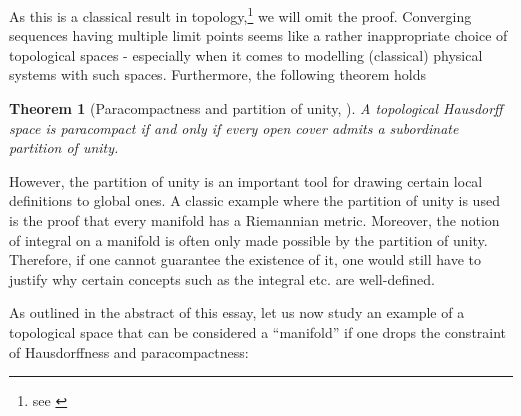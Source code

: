 \documentclass[a4paper, 12pt]{article}
\newtheorem{theorem}{Theorem}
\theoremstyle{iremark}
\begin{document}
As this is a classical result in topology,\footnote{see \cite{wiki}} we will omit the proof. 
Converging sequences having multiple limit points seems like a rather inappropriate choice of topological spaces 
- especially when it comes to modelling (classical) physical systems with such spaces.
Furthermore, the following theorem holds
\begin{theorem}[Paracompactness and partition of unity, \cite{toenniessen}]
    A topological Hausdorff space is paracompact if and only if every open cover admits a subordinate partition of unity.
\end{theorem}
However, the partition of unity is an important tool for drawing certain local definitions to global ones. 
A classic example where the partition of unity is used is the proof that every manifold has a Riemannian metric. 
Moreover, the notion of integral on a manifold is often only made possible by the partition of unity. 
Therefore, if one cannot guarantee the existence of it, one would still have to justify why certain concepts such as 
the integral etc. are well-defined.

As outlined in the abstract of this essay, let us now study an example of a topological space that can be considered a 
``manifold'' if one drops the constraint of Hausdorffness and paracompactness:
\end{document}
